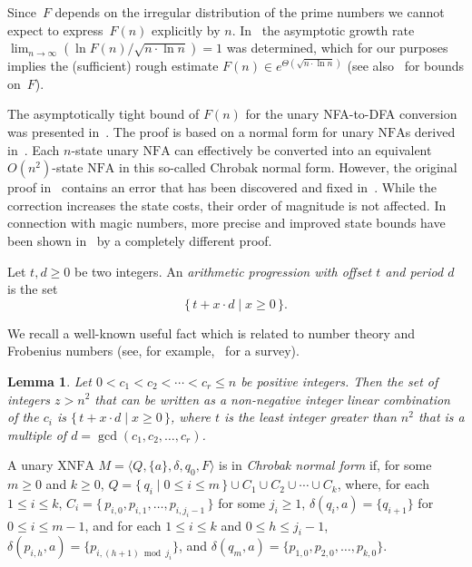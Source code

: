 \documentclass[final,copyright,noderivs]{eptcs}
\theoremstyle{plain}
\newtheorem{lemma}[theorem]{Lemma}
\theoremstyle{definition}
\newcommand{\nfa}{\textrm{NFA}}
\newcommand{\xnfa}{\textrm{XNFA}}
\begin{document}
Since~$F$ depends on the irregular distribution of the prime numbers we cannot
expect to express~$F(n)$ explicitly by $n$. 
In~\cite{Landau:1903:mpgg,Landau:1909:hlvp:book}
the asymptotic growth rate $\lim_{n\to\infty} (\ln
F(n)/\sqrt{n\cdot\ln n})=1$ was determined, which for our purposes
implies the (sufficient) rough estimate $F(n) \in
e^{\Theta(\sqrt{n\cdot\ln n})}$
(see also~\cite{ellul:2004:dcmrl,Szalay:1980:mos} for
bounds on~$F$). 
\begin{sloppypar}
The asymptotically tight bound of $F(n)$ for the unary NFA-to-DFA
conversion was presented \mbox{in~\cite{Chrobak:1986:FAUL,Chrobak:2003:ERRFAUL}.}
The proof is based on a normal form for unary $\nfa$s derived 
in~\cite{Chrobak:1986:FAUL}. Each $n$-state unary $\nfa$ can
effectively be converted into an equivalent $O(n^2)$-state $\nfa$ 
in this so-called Chrobak normal form.
However, the original proof in~\cite{Chrobak:1986:FAUL} 
contains an error that has been discovered and fixed 
in~\cite{to:2009:ufaap}. While the correction increases the state costs,
their order of magnitude is not affected.
In connection with magic numbers, more precise and improved state bounds have
been shown in~\cite{geffert:2007:mnshfa} by a completely different proof.
\end{sloppypar}

Let $t,d\geq 0$ be two integers. An \emph{arithmetic progression with 
offset $t$ and period $d$} is the set 
$$
\{\, t + x\cdot d\mid x\geq 0\,\}.
$$

We recall a well-known useful fact 
which is related to number theory and Frobenius numbers 
(see, for example,~\cite{shallit:2008:fpaig} for a survey).

\begin{lemma}\label{lem:all-unary-words}
Let $0 < c_1 < c_2 < \cdots < c_r\leq n$ be positive integers. 
Then the set of integers $z > n^2$ that can be written as a non-negative 
integer linear combination of the $c_i$ 
is $\{\, t + x\cdot d\mid x\geq 0\,\}$, where
$t$ is the least integer greater than $n^2$ that is a 
multiple of $d = \gcd(c_1,c_2,\dots, c_r)$.
\end{lemma}

\begin{sloppypar}
A unary $\xnfa$ $M=\langle Q,\{a\},\delta,q_0,F\rangle$
is in \emph{Chrobak normal form} if, for some $m\geq 0$ and \mbox{$k\geq 0$,} 
\mbox{$Q = \{\, q_i \mid 0\leq i\leq m\,\} \cup C_1 \cup C_2 \cup \cdots \cup C_k$,}
where, for each $1\leq i\leq k$,
$C_i=\{\, p_{i,0}, p_{i,1},\dots ,p_{i,j_{i}-1}\,\}$ for some $j_i\geq 1$,
$\delta(q_i,a)=\{q_{i+1}\}$ for \mbox{$0\leq i\leq m-1$,}
and for each $1\leq i\leq k$ and $0\leq h\leq j_i-1$,
\mbox{$\delta(p_{i,h},a)=\{p_{i,(h+1)\bmod j_i}\}$,} and
\mbox{$\delta(q_m,a)=\{p_{1,0}, p_{2,0},\dots, p_{k,0}\}$.}
\end{sloppypar}
\end{document}
